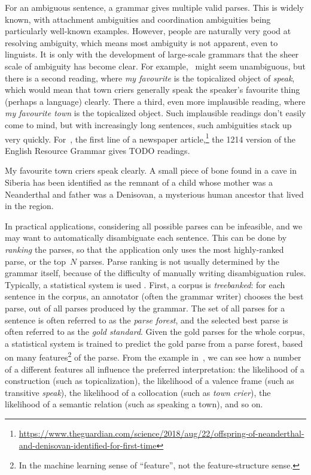 \documentclass[output=paper]{langsci/langscibook}
\begin{document}
For an ambiguous sentence,
a grammar gives multiple valid parses.
This is widely known, with attachment ambiguities and coordination ambiguities
being particularly well-known examples.
However, people are naturally very good at resolving ambiguity,
which means most ambiguity is not apparent, even to linguists.
It is only with the development of large-scale grammars that the sheer scale of ambiguity has become clear.
For example, ~might seem unambiguous,
but there is a second reading, where \textit{my favourite} is the topicalized object of \textit{speak},
which would mean that town criers generally speak the speaker's favourite thing (perhaps a language) clearly.
There a third, even more implausible reading, where \textit{my favourite town} is the topicalized object.
Such implausible readings don't easily come to mind,
but with increasingly long sentences, such ambiguities stack up very quickly.
For~, the first line of a newspaper article,\footnote{%
	\url{https://www.theguardian.com/science/2018/aug/22/offspring-of-neanderthal-and-denisovan-identified-for-first-time}
}
the 1214 version of the English Resource Grammar \citep{Flickinger2000a,Flickinger2011a-u}
gives TODO readings.
\begin{exe}
\ex\label{cl:ex:ambig-simple}
My favourite town criers speak clearly.
\ex\label{cl:ex:ambig-many}
A small piece of bone found in a cave in Siberia has been identified as the remnant of a child whose mother was a Neanderthal and father was a Denisovan, a mysterious human ancestor that lived in the region.
\end{exe}

In practical applications, considering all possible parses can be infeasible,
and we may want to automatically disambiguate each sentence.
This can be done by \textit{ranking} the parses,
so that the application only uses the most highly-ranked parse,
or the top~$N$ parses.
Parse ranking is not usually determined by the grammar itself,
because of the difficulty of manually writing disambiguation rules.
Typically, a statistical system is used \citep{OFTM2004a-u-platte}.
First, a corpus is \textit{treebanked}:
for each sentence in the corpus,
an annotator (often the grammar writer) chooses the best parse,
out of all parses produced by the grammar.
The set of all parses for a sentence is often referred to as the \textit{parse forest},
and the selected best parse is often referred to as the \textit{gold standard}.
Given the gold parses for the whole corpus, a statistical system is trained
to predict the gold parse from a parse forest,
based on many features\footnote{%
	In the machine learning sense of ``feature'',
	not the feature-structure sense.
}
of the parse.
From the example in~,
we can see how a number of a different features all influence the preferred interpretation:
the likelihood of a construction (such as topicalization),
the likelihood of a valence frame (such as transitive \textit{speak}),
the likelihood of a collocation (such as \textit{town crier}),
the likelihood of a semantic relation (such as speaking a town),
and so on.
\end{document}
